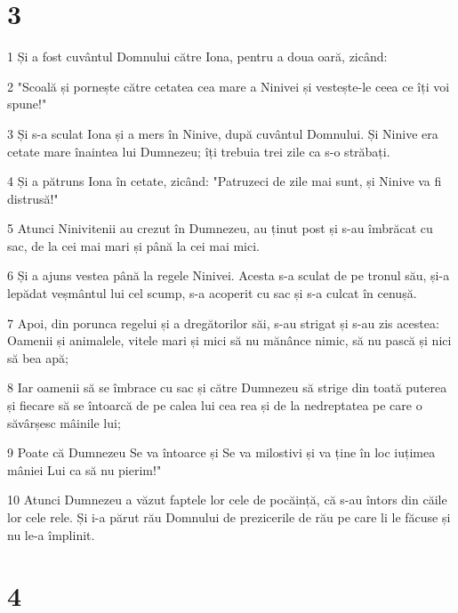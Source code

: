 \chapter{3}

\par 1 Și a fost cuvântul Domnului către Iona, pentru a doua oară, zicând:
\par 2 "Scoală și pornește către cetatea cea mare a Ninivei și vestește-le ceea ce îți voi spune!"
\par 3 Și s-a sculat Iona și a mers în Ninive, după cuvântul Domnului. Și Ninive era cetate mare înaintea lui Dumnezeu; îți trebuia trei zile ca s-o străbați.
\par 4 Și a pătruns Iona în cetate, zicând: "Patruzeci de zile mai sunt, și Ninive va fi distrusă!"
\par 5 Atunci Ninivitenii au crezut în Dumnezeu, au ținut post și s-au îmbrăcat cu sac, de la cei mai mari și până la cei mai mici.
\par 6 Și a ajuns vestea până la regele Ninivei. Acesta s-a sculat de pe tronul său, și-a lepădat veșmântul lui cel scump, s-a acoperit cu sac și s-a culcat în cenușă.
\par 7 Apoi, din porunca regelui și a dregătorilor săi, s-au strigat și s-au zis acestea: Oamenii și animalele, vitele mari și mici să nu mănânce nimic, să nu pască și nici să bea apă;
\par 8 Iar oamenii să se îmbrace cu sac și către Dumnezeu să strige din toată puterea și fiecare să se întoarcă de pe calea lui cea rea și de la nedreptatea pe care o săvârșesc mâinile lui;
\par 9 Poate că Dumnezeu Se va întoarce și Se va milostivi și va ține în loc iuțimea mâniei Lui ca să nu pierim!"
\par 10 Atunci Dumnezeu a văzut faptele lor cele de pocăință, că s-au întors din căile lor cele rele. Și i-a părut rău Domnului de prezicerile de rău pe care li le făcuse și nu le-a împlinit.

\chapter{4}

